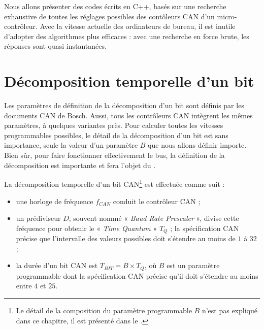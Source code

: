Nous allons présenter des codes écrits en C++, basés sur une recherche exhaustive de toutes les réglages possibles des contôleurs CAN d'un micro-contrôleur. Avec la vitesse actuelle des ordinateurs de bureau, il est inutile d'adopter des algorithmes plus efficaces : avec une recherche en force brute, les réponses sont quasi instantanées.







\section{Décomposition temporelle d'un bit}

Les paramètres de définition de la décomposition d'un bit sont définis par les documents CAN de Bosch\cite{canSpecifBosch}. Aussi, tous les contrôleurs CAN intègrent les mêmes paramètres, à quelques variantes près. Pour calculer toutes les vitesses programmables possibles, le détail de la décomposition d'un bit est sans importance, seule la valeur d'un paramètre $B$ que nous allons définir importe. Bien sûr, pour faire fonctionner effectivement le bus, la définition de la décomposition est importante et fera l'objet du .

La décomposition temporelle d'un bit CAN\footnote{Le détail de la composition du paramètre programmable $B$ n'est pas expliqué dans ce chapitre, il est présenté dans le .} est effectuée comme suit :
\begin{itemize}
\item une horloge de fréquence $f_{CAN}$ conduit le contrôleur CAN ;
\item un prédiviseur $D$, souvent nommé « \emph{Baud Rate Prescaler} », divise cette fréquence pour obtenir le « \emph{Time Quantum} » $T_Q$ ; la spécification CAN précise que l'intervalle des valeurs possibles doit s'étendre au moins de $1$ à $32$ ;
\item la durée d'un bit CAN est $T_{BIT} = B\times T_Q$, où $B$ est un paramètre programmable dont la spécification CAN \cite{canSpecifBosch} précise qu'il doit s'étendre au moins entre $4$ et $25$.
\end{itemize}


